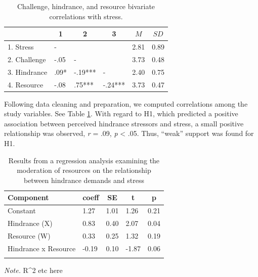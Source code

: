 \documentclass[
  man]{apa6}
\begin{document}
\begin{table}[tbp]

\begin{center}
\begin{threeparttable}

\caption{\label{tab:cortab}Challenge, hindrance, and resource bivariate correlations with stress.}

\begin{tabular}{llllll}
\toprule
 & \multicolumn{1}{c}{1} & \multicolumn{1}{c}{2} & \multicolumn{1}{c}{3} & \multicolumn{1}{c}{$M$} & \multicolumn{1}{c}{$SD$}\\
\midrule
1. Stress & - &  &  & 2.81 & 0.89\\
2. Challenge & -.05 & - &  & 3.73 & 0.48\\
3. Hindrance & .09* & -.19*** & - & 2.40 & 0.75\\
4. Resource & -.08 & .75*** & -.24*** & 3.73 & 0.47\\
\bottomrule
\end{tabular}

\end{threeparttable}
\end{center}

\end{table}

Following data cleaning and preparation, we computed correlations among the study variables. See Table \ref{tab:cortab}. With regard to H1, which predicted a positive association between perceived hindrance stressors and stress, a small positive relationship was observed, \emph{r} = .09, \emph{p} \textless{} .05. Thus, ``weak'' support was found for H1.

\begin{table}[tbp]

\begin{center}
\begin{threeparttable}

\caption{\label{tab:table}Results from a regression analysis examining the moderation of resources on the relationship between hindrance demands and stress}

\begin{tabular}{lllll}
\toprule
Component & \multicolumn{1}{c}{coeff} & \multicolumn{1}{c}{SE} & \multicolumn{1}{c}{t} & \multicolumn{1}{c}{p}\\
\midrule
Constant & 1.27 & 1.01 & 1.26 & 0.21\\
Hindrance (X) & 0.83 & 0.40 & 2.07 & 0.04\\
Resource (W) & 0.33 & 0.25 & 1.32 & 0.19\\
Hindrance x Resource & -0.19 & 0.10 & -1.87 & 0.06\\
\bottomrule
\addlinespace
\end{tabular}

\begin{tablenotes}[para]
\normalsize{\textit{Note.} R\textasciicircum{}2 etc here}
\end{tablenotes}

\end{threeparttable}
\end{center}

\end{table}
\end{document}
